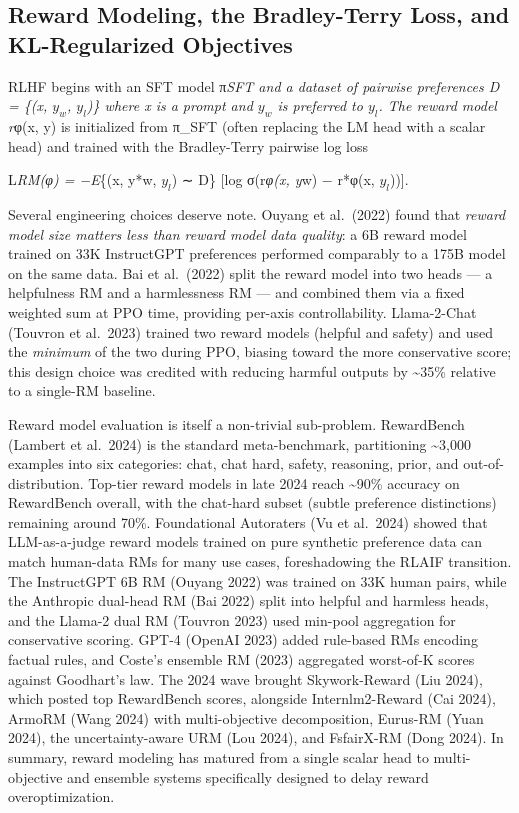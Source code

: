 \subsection{Reward Modeling, the Bradley-Terry Loss, and KL-Regularized Objectives}\label{reward-modeling-the-bradley-terry-loss-and-kl-regularized-objectives}

RLHF begins with an SFT model π\emph{SFT and a dataset of pairwise preferences D = \{(x, \(y_w\), \(y_l\))\} where x is a prompt and \(y_w\) is preferred to \(y_l\). The reward model r}φ(x, y) is initialized from π\_SFT (often replacing the LM head with a scalar head) and trained with the Bradley-Terry pairwise log loss

L\emph{RM(φ) = −E}\{(x, y*w, \(y_l\)) ∼ D\} {[}log σ(r\emph{φ(x, y}w) − r*φ(x, \(y_l\))){]}.

Several engineering choices deserve note. Ouyang et al.~(2022) found that \emph{reward model size matters less than reward model data quality}: a 6B reward model trained on 33K InstructGPT preferences performed comparably to a 175B model on the same data. Bai et al.~(2022) split the reward model into two heads --- a helpfulness RM and a harmlessness RM --- and combined them via a fixed weighted sum at PPO time, providing per-axis controllability. Llama-2-Chat (Touvron et al.~2023) trained two reward models (helpful and safety) and used the \emph{minimum} of the two during PPO, biasing toward the more conservative score; this design choice was credited with reducing harmful outputs by \textasciitilde35\% relative to a single-RM baseline.

Reward model evaluation is itself a non-trivial sub-problem. RewardBench (Lambert et al.~2024) is the standard meta-benchmark, partitioning \textasciitilde3,000 examples into six categories: chat, chat hard, safety, reasoning, prior, and out-of-distribution. Top-tier reward models in late 2024 reach \textasciitilde90\% accuracy on RewardBench overall, with the chat-hard subset (subtle preference distinctions) remaining around 70\%. Foundational Autoraters (Vu et al.~2024) showed that LLM-as-a-judge reward models trained on pure synthetic preference data can match human-data RMs for many use cases, foreshadowing the RLAIF transition. The InstructGPT 6B RM (Ouyang 2022) was trained on 33K human pairs, while the Anthropic dual-head RM (Bai 2022) split into helpful and harmless heads, and the Llama-2 dual RM (Touvron 2023) used min-pool aggregation for conservative scoring. GPT-4 (OpenAI 2023) added rule-based RMs encoding factual rules, and Coste's ensemble RM (2023) aggregated worst-of-K scores against Goodhart's law. The 2024 wave brought Skywork-Reward (Liu 2024), which posted top RewardBench scores, alongside Internlm2-Reward (Cai 2024), ArmoRM (Wang 2024) with multi-objective decomposition, Eurus-RM (Yuan 2024), the uncertainty-aware URM (Lou 2024), and FsfairX-RM (Dong 2024). In summary, reward modeling has matured from a single scalar head to multi-objective and ensemble systems specifically designed to delay reward overoptimization.

